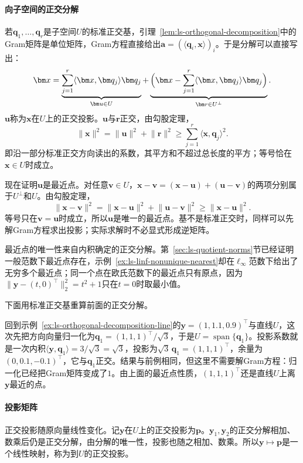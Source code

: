 \paragraph{向子空间的正交分解}
若$\bm q_1,\ldots,\bm q_r$是子空间$U$的标准正交基，引理~\ref{lem:ls-orthogonal-decomposition}中的Gram矩阵是单位矩阵，Gram方程直接给出$\bm a=(\langle\bm q_i,\bm x\rangle)_i$。于是分解可以直接写出：
\begin{equation}
 \bm x=\underbrace{\sum_{j=1}^r\langle\bm x,\bm q_j\rangle\bm q_j}_{\bm u\in U}+\underbrace{\Bigl(\bm x-\sum_{j=1}^r\langle\bm x,\bm q_j\rangle\bm q_j\Bigr)}_{\bm r\in U^\perp}.
 \label{eq:ls-orthonormal-projection}
\end{equation}
$\bm u$称为$\bm x$在$U$上的正交投影。$\bm u$与$\bm r$正交，由勾股定理，
\[
 \lVert\bm x\rVert^2=\lVert\bm u\rVert^2+\lVert\bm r\rVert^2\geq\sum_{j=1}^r\langle\bm x,\bm q_j\rangle^2.
\]
即沿一部分标准正交方向读出的系数，其平方和不超过总长度的平方；等号恰在$\bm x\in U$时成立。

现在证明$\bm u$是最近点。对任意$\bm v\in U$，$\bm x-\bm v=(\bm x-\bm u)+(\bm u-\bm v)$的两项分别属于$U^\perp$和$U$。由勾股定理，
\[
 \lVert\bm x-\bm v\rVert^2=\lVert\bm x-\bm u\rVert^2+\lVert\bm u-\bm v\rVert^2\geq\lVert\bm x-\bm u\rVert^2.
\]
等号只在$\bm v=\bm u$时成立，所以$\bm u$是唯一的最近点。基不是标准正交时，同样可以先解Gram方程求出投影；实际求解时不必显式形成逆矩阵。

最近点的唯一性来自内积确定的正交分解。第~\ref{sec:ls-quotient-norms}节已经证明一般范数下最近点存在，示例~\ref{ex:ls-linf-nonunique-nearest}却在$\ell_\infty$范数下给出了无穷多个最近点；同一个点在欧氏范数下的最近点只有原点，因为$\lVert\bm y-(t,0)^\top\rVert_2^2=t^2+1$只在$t=0$时取最小值。

下面用标准正交基重算前面的正交分解。
\begin{example}[用标准正交基重算正交分解]
\label{ex:ls-orthonormal-projection-line}
回到示例~\ref{ex:ls-orthogonal-decomposition-line}的$\bm y=(1,1.1,0.9)^\top$与直线$U$，这次先把方向向量归一化为$\bm q_1=(1,1,1)^\top/\sqrt3$，于是$U=\operatorname{span}\{\bm q_1\}$。投影系数就是一次内积$\langle\bm y,\bm q_1\rangle=3/\sqrt3=\sqrt3$，投影为$\sqrt3\,\bm q_1=(1,1,1)^\top$，余量为$(0,0.1,-0.1)^\top$，它与$\bm q_1$正交。结果与前例相同，但这里不需要解Gram方程：归一化已经把Gram矩阵变成了$1$。由上面的最近点性质，$(1,1,1)^\top$还是直线$U$上离$\bm y$最近的点。
\end{example}

\paragraph{投影矩阵}
\label{sec:ls-projection-matrices}
正交投影随原向量线性变化。记$\bm y$在$U$上的正交投影为$\bm p$。$\bm y_1,\bm y_2$的正交分解相加、数乘后仍是正交分解，由分解的唯一性，投影也随之相加、数乘。所以$\bm y\mapsto\bm p$是一个线性映射，称为到$U$的正交投影。


